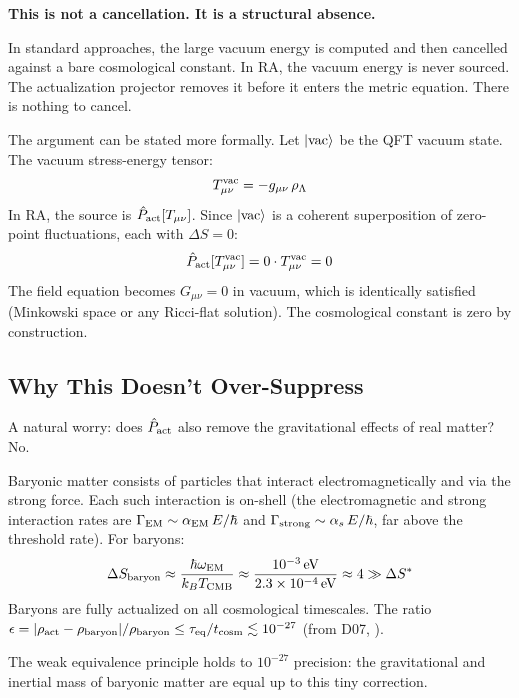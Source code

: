 \documentclass[12pt,a4paper]{article}
\begin{document}
\textbf{This is not a cancellation.  It is a structural absence.}

In standard approaches, the large vacuum energy is computed and then cancelled against a bare cosmological constant.  In RA, the vacuum energy is never sourced.  The actualization projector removes it before it enters the metric equation.  There is nothing to cancel.

The argument can be stated more formally.  Let $|{\rm vac}\rangle$ be the QFT vacuum state.  The vacuum stress-energy tensor:
\begin{equation}
  T^{\rm vac}_{\mu\nu} = -g_{\mu\nu}\,\rho_\Lambda
\end{equation}
In RA, the source is $\hat{P}_{\mathrm{act}}[T_{\mu\nu}]$.  Since $|{\rm vac}\rangle$ is a coherent superposition of zero-point fluctuations, each with $\Delta S=0$:
\begin{equation}
  \hat{P}_{\mathrm{act}}[T^{\rm vac}_{\mu\nu}] = 0 \cdot T^{\rm vac}_{\mu\nu} = 0
\end{equation}
The field equation becomes $G_{\mu\nu}=0$ in vacuum, which is identically satisfied (Minkowski space or any Ricci-flat solution).  The cosmological constant is zero by construction.

\subsection{Why This Doesn't Over-Suppress}

A natural worry: does $\hat{P}_{\mathrm{act}}$ also remove the gravitational effects of real matter?  No.

Baryonic matter consists of particles that interact electromagnetically and via the strong force.  Each such interaction is on-shell (the electromagnetic and strong interaction rates are $\Gamma_{\rm EM}\sim\alpha_{\rm EM}\,E/\hbar$ and $\Gamma_{\rm strong}\sim\alpha_s\,E/\hbar$, far above the threshold rate).  For baryons:
\begin{equation}
  \Delta S_{\rm baryon}\approx\frac{\hbar\omega_{\rm EM}}{k_BT_{\rm CMB}} \approx \frac{10^{-3}\,\mathrm{eV}}{2.3\times10^{-4}\,\mathrm{eV}} \approx 4 \gg \Delta S^*
\end{equation}
Baryons are fully actualized on all cosmological timescales.  The ratio $\epsilon=|\rho_{\rm act}-\rho_{\rm baryon}|/\rho_{\rm baryon}\leq\tau_{\rm eq}/t_{\rm cosm}\lesssim10^{-27}$ (from D07, \statusDR).

The weak equivalence principle holds to $10^{-27}$ precision: the gravitational and inertial mass of baryonic matter are equal up to this tiny correction.
\end{document}
